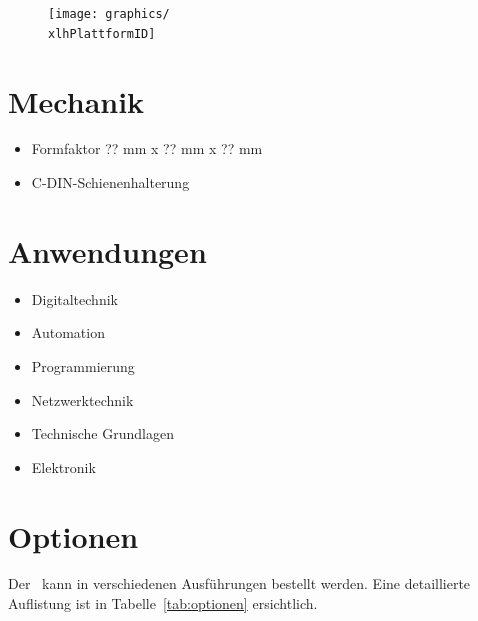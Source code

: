\documentclass[10pt]{datasheet}
\begin{document}
\begin{figure}[h]
    \centering
    \texttt{[image: graphics/\\xlhPlattformID]}
\end{figure}

\section{Mechanik}

\begin{itemize}
    \item Formfaktor ?? mm x ?? mm x ?? mm
    \item C-DIN-Schienenhalterung
\end{itemize}

\section{Anwendungen}

\begin{itemize}
    \item Digitaltechnik
    \item Automation
    \item Programmierung
    \item Netzwerktechnik
    \item Technische Grundlagen
    \item Elektronik
\end{itemize}

\vfill\break


\onecolumn

\section{Optionen}
Der \xlhPlattformID\ kann in verschiedenen Ausführungen bestellt werden.
Eine detaillierte Auflistung ist in Tabelle~\ref{tab:optionen} ersichtlich.
\end{document}
